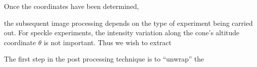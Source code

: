 Once the coordinates have been determined, 

the subsequent image processing
depends on the type of experiment being carried out.  For speckle
experiments, the intensity variation along the cone's altitude coordinate
$\theta$ is not important.  Thus we wish to extract 

The first step in the post processing technique is to ``unwrap'' the 
\cite{schindelin2012fiji}
